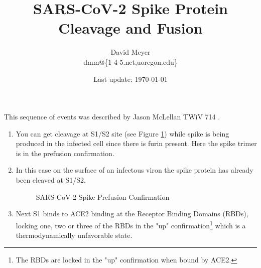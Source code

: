 \documentclass[11pt, oneside]{article}   	%
\title{SARS-CoV-2 Spike Protein Cleavage and Fusion}
\author{David Meyer \\ dmm@\{1-4-5.net,uoregon.edu\}}
\date{Last update: \today}							%
\begin{document}
\maketitle

\noindent
This sequence of events was described by Jason McLellan TWiV 714 \cite{covid:spike}.

\begin{enumerate}
\item You can get cleavage at S1/S2 site (see Figure \ref{fig:prefusion}) while spike is being produced in the
infected cell since there is	furin present. Here the spike trimer is in the prefusion confirmation.

\item In this case on the surface of an infectous viron the spike protein has already been cleaved at S1/S2. 

\bigskip
\begin{figure} [H]
\caption{SARS-CoV-2 Spike Prefusion Confirmation \cite{covid:prefusion}}
\label{fig:prefusion}
\end{figure}


\item  Next S1 binds to ACE2 binding at the Receptor Binding Domains (RBDs),
locking one, two or three of the RBDs in the "up" confirmation\footnote{The RBDs are locked 
in the "up" confirmation when bound by ACE2.} which is a thermodynamically unfavorable state.


\end{enumerate}
\end{document}
